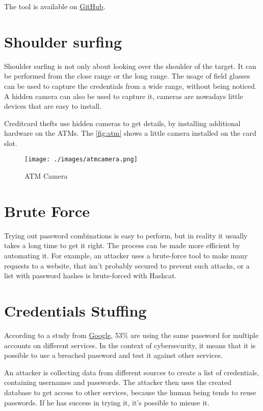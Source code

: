 The tool is available on \href{https://github.com/gentilkiwi/mimikatz}{GitHub}. 

\section{Shoulder surfing}
Shoulder surfing is not only about looking over the shoulder of the target.
It can be performed from the close range or the long range.
The usage of field glasses can be used to capture the credentials from a wide range, without being noticed.
A hidden camera can also be used to capture it, cameras are nowadays little devices that are easy to install.

Creditcard thefts use hidden cameras to get details, by installing additional hardware on the ATMs.
The \autoref{fig:atm} shows a little camera installed on the card slot.

\begin{figure}[h]
    \centering
    \texttt{[image: ./images/atmcamera.png]}
    \caption{ATM Camera}
    \label{fig:atm}
\end{figure}

\section{Brute Force}
Trying out password combinations is easy to perform, but in reality it usually takes a long time to get it right.
The process can be made more efficient by automating it.
For example, an attacker uses a brute-force tool to make many requests to a website, that isn't probably secured to prevent such attacks, or a list with password hashes is brute-forced with Hashcat.


\section{Credentials Stuffing}
According to a study from \href{https://services.google.com/fh/files/blogs/google_security_infographic.pdf}{Google}, 53\% are using the same password for multiple accounts on different services.
In the context of cybersecurity, it means that it is possible to use a breached password and test it against other services.

An attacker is collecting data from different sources to create a list of credentials, containing usernames and passwords.
The attacker then uses the created database to get access to other services, because the human being tends to reuse passwords.
If he has success in trying it, it's possible to misuse it.

